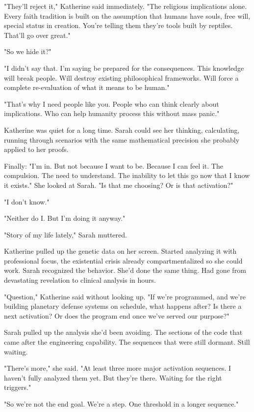 "They'll reject it," Katherine said immediately. "The religious implications alone. Every faith tradition is built on the assumption that humans have souls, free will, special status in creation. You're telling them they're tools built by reptiles. That'll go over great."

"So we hide it?"

"I didn't say that. I'm saying be prepared for the consequences. This knowledge will break people. Will destroy existing philosophical frameworks. Will force a complete re-evaluation of what it means to be human."

"That's why I need people like you. People who can think clearly about implications. Who can help humanity process this without mass panic."

Katherine was quiet for a long time. Sarah could see her thinking, calculating, running through scenarios with the same mathematical precision she probably applied to her proofs.

Finally: "I'm in. But not because I want to be. Because I can feel it. The compulsion. The need to understand. The inability to let this go now that I know it exists." She looked at Sarah. "Is that me choosing? Or is that activation?"

"I don't know."

"Neither do I. But I'm doing it anyway."

"Story of my life lately," Sarah muttered.

Katherine pulled up the genetic data on her screen. Started analyzing it with professional focus, the existential crisis already compartmentalized so she could work. Sarah recognized the behavior. She'd done the same thing. Had gone from devastating revelation to clinical analysis in hours.

"Question," Katherine said without looking up. "If we're programmed, and we're building planetary defense systems on schedule, what happens after? Is there a next activation? Or does the program end once we've served our purpose?"

Sarah pulled up the analysis she'd been avoiding. The sections of the code that came after the engineering capability. The sequences that were still dormant. Still waiting.

"There's more," she said. "At least three more major activation sequences. I haven't fully analyzed them yet. But they're there. Waiting for the right triggers."

"So we're not the end goal. We're a step. One threshold in a longer sequence."

